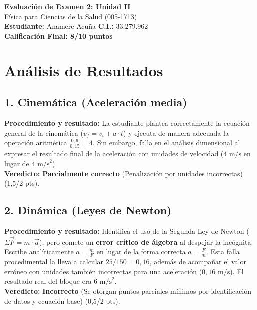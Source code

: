 \documentclass[12pt,letterpaper]{article}
\begin{document}
\begin{center}
    \Large \textbf{Evaluación de Examen 2: Unidad II} \\
    \large Física para Ciencias de la Salud (005-1713) \\
    \vspace{0.5cm}
    \textbf{Estudiante:} Anamerc Acuña \quad \textbf{C.I.:} 33.279.962
    \vspace{0.3cm} \\
    \large \textbf{Calificación Final: 8/10 puntos}
\end{center}

\vspace{0.5cm}

\section*{Análisis de Resultados}

\subsection*{1. Cinemática (Aceleración media)}
\textbf{Procedimiento y resultado:} La estudiante plantea correctamente la ecuación general de la cinemática ($v_f = v_i + a \cdot t$) y ejecuta de manera adecuada la operación aritmética $\frac{0,6}{0,15} = 4$. Sin embargo, falla en el análisis dimensional al expresar el resultado final de la aceleración con unidades de velocidad ($4 \text{ m/s}$ en lugar de $4 \text{ m/s}^2$). \\
\textbf{Veredicto:} \textbf{Parcialmente correcto} (Penalización por unidades incorrectas) (1,5/2 pts).

\subsection*{2. Dinámica (Leyes de Newton)}
\textbf{Procedimiento y resultado:} Identifica el uso de la Segunda Ley de Newton ($\Sigma \vec{F} = m \cdot \vec{a}$), pero comete un \textbf{error crítico de álgebra} al despejar la incógnita. Escribe analíticamente $a = \frac{m}{F}$ en lugar de la forma correcta $a = \frac{F}{m}$. Esta falla procedimental la lleva a calcular $25 / 150 = 0,16$, además de acompañar el valor erróneo con unidades también incorrectas para una aceleración ($0,16 \text{ m/s}$). El resultado real del bloque era $6 \text{ m/s}^2$. \\
\textbf{Veredicto:} \textbf{Incorrecto} (Se otorgan puntos parciales mínimos por identificación de datos y ecuación base) (0,5/2 pts).
\end{document}
